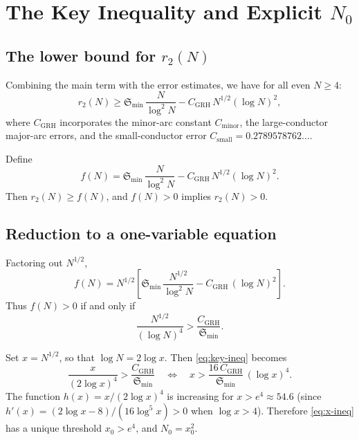 \documentclass[11pt,a4paper]{article}
\theoremstyle{plain}
\theoremstyle{definition}
\theoremstyle{remark}
\numberwithin{equation}{section}
\numberwithin{table}{section}
\begin{document}
\section{The Key Inequality and Explicit $N_0$}
\label{sec:N0}

\subsection{The lower bound for $r_2(N)$}

Combining the main term with the error estimates, we have for all even
$N\ge 4$:
\begin{equation}
\label{eq:r2lower}
  r_2(N) \ge \mathfrak{S}_{\min}\,\frac{N}{\log^2 N}
  - C_{\mathrm{GRH}}\,N^{1/2}(\log N)^2,
\end{equation}
where $C_{\mathrm{GRH}}$ incorporates the minor-arc constant
$C_{\mathrm{minor}}$, the large-conductor major-arc errors, and the
small-conductor error $C_{\mathrm{small}}=0.2789578762\ldots$.

Define
\begin{equation}
  f(N) = \mathfrak{S}_{\min}\,\frac{N}{\log^2 N}
  - C_{\mathrm{GRH}}\,N^{1/2}(\log N)^2.
\end{equation}
Then $r_2(N)\ge f(N)$, and $f(N)>0$ implies $r_2(N)>0$.

\subsection{Reduction to a one-variable equation}

Factoring out $N^{1/2}$,
\begin{equation}
  f(N) = N^{1/2}\left[
  \mathfrak{S}_{\min}\,\frac{N^{1/2}}{\log^2 N}
  - C_{\mathrm{GRH}}\,(\log N)^2\right].
\end{equation}
Thus $f(N)>0$ if and only if
\begin{equation}
\label{eq:key-ineq}
  \frac{N^{1/2}}{(\log N)^4} > \frac{C_{\mathrm{GRH}}}{\mathfrak{S}_{\min}}.
\end{equation}

Set $x=N^{1/2}$, so that $\log N=2\log x$.  Then
\eqref{eq:key-ineq} becomes
\begin{equation}
\label{eq:x-ineq}
  \frac{x}{(2\log x)^4} > \frac{C_{\mathrm{GRH}}}{\mathfrak{S}_{\min}}
  \quad\Longleftrightarrow\quad
  x > \frac{16\,C_{\mathrm{GRH}}}{\mathfrak{S}_{\min}}\,(\log x)^4.
\end{equation}
The function $h(x)=x/(2\log x)^4$ is increasing for
$x>e^4\approx 54.6$ (since $h'(x)=(2\log x-8)/(16\log^5 x)>0$ when
$\log x>4$).  Therefore \eqref{eq:x-ineq} has a unique threshold $x_0>e^4$,
and $N_0=x_0^2$.
\end{document}

